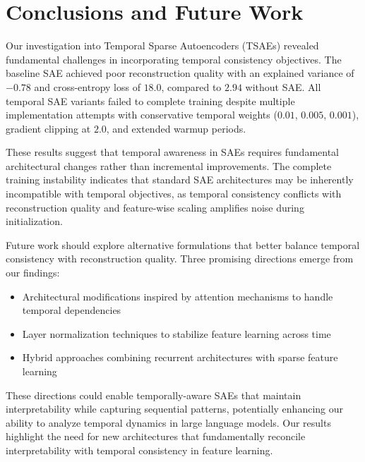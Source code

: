 \documentclass{article} %
\begin{document}
\section{Conclusions and Future Work}
\label{sec:conclusion}

Our investigation into Temporal Sparse Autoencoders (TSAEs) revealed fundamental challenges in incorporating temporal consistency objectives. The baseline SAE achieved poor reconstruction quality with an explained variance of $-0.78$ and cross-entropy loss of $18.0$, compared to $2.94$ without SAE. All temporal SAE variants failed to complete training despite multiple implementation attempts with conservative temporal weights ($0.01$, $0.005$, $0.001$), gradient clipping at $2.0$, and extended warmup periods.

These results suggest that temporal awareness in SAEs requires fundamental architectural changes rather than incremental improvements. The complete training instability indicates that standard SAE architectures may be inherently incompatible with temporal objectives, as temporal consistency conflicts with reconstruction quality and feature-wise scaling amplifies noise during initialization.

Future work should explore alternative formulations that better balance temporal consistency with reconstruction quality. Three promising directions emerge from our findings:

\begin{itemize}
    \item Architectural modifications inspired by attention mechanisms to handle temporal dependencies
    \item Layer normalization techniques to stabilize feature learning across time
    \item Hybrid approaches combining recurrent architectures with sparse feature learning
\end{itemize}

These directions could enable temporally-aware SAEs that maintain interpretability while capturing sequential patterns, potentially enhancing our ability to analyze temporal dynamics in large language models. Our results highlight the need for new architectures that fundamentally reconcile interpretability with temporal consistency in feature learning.



\end{document}
